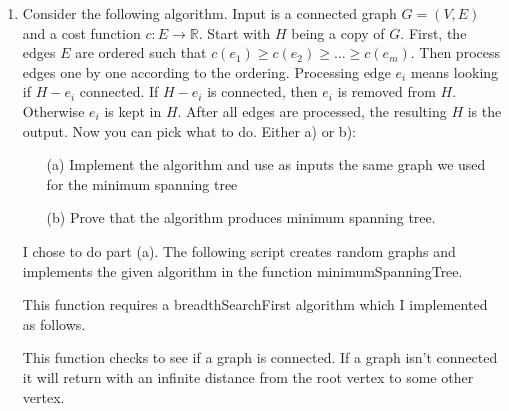 \documentclass[11pt, oneside]{article}
\begin{document}
\begin{enumerate}
  \item %
    Consider the following algorithm. Input is a connected graph $G=(V,E)$ and
    a cost function $c:E \rightarrow \mathbb{R}$.
    Start with $H$ being a copy of $G$.
    First, the edges $E$ are ordered such that
    $c(e_1) \geq c(e_2) \geq \ldots \geq c(e_m)$.
    Then process edges one by one according to the ordering.
    Processing edge $e_i$ means looking if $H-e_i$ connected.
    If $H-e_i$ is connected, then $e_i$ is removed from $H$.
    Otherwise $e_i$ is kept in $H$.
    After all edges are processed, the resulting $H$ is the output.
    Now you can pick what to do.
    Either a) or b):
    \begin{enumerate}
      \item[(a)]
        Implement the algorithm and use as inputs the same graph we used for the minimum spanning tree
      \item[(b)]
        Prove that the algorithm produces minimum spanning tree.
    \end{enumerate}

    I chose to do part (a).
    The following script creates random graphs and implements the given
    algorithm in the function minimumSpanningTree.
    
    This function requires a breadthSearchFirst algorithm which I implemented
    as follows.
    
    This function checks to see if a graph is connected.
    If a graph isn't connected it will return with an infinite
    distance from the root vertex to some other vertex.


\end{enumerate}
\end{document}
